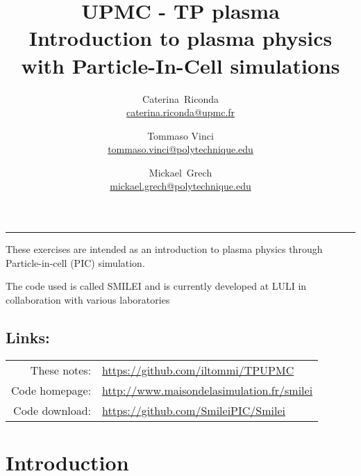 \documentclass[11pt,a4paper]{article}
\begin{document}
\title{UPMC - TP plasma \\ \vspace{10pt} Introduction to plasma physics \\ \vspace{10pt} with Particle-In-Cell simulations}


\author{Caterina~Riconda \\ {\tiny\url{caterina.riconda@upmc.fr}} \and Tommaso Vinci \\ {\tiny\url{tommaso.vinci@polytechnique.edu}} \and Mickael~Grech \\ {\tiny\url{mickael.grech@polytechnique.edu}}}

\date{}

\maketitle              

\hrule
\vspace*{20pt}

These exercises are  intended as an introduction to plasma physics through Particle-in-cell (PIC) simulation.

The code used is called SMILEI and is currently developed at LULI in collaboration with various laboratories 

\subsection*{Links:}
\begin{tabularx}{0.95\textwidth}{rl}
These notes: & \url{https://github.com/iltommi/TPUPMC} \\
Code homepage: & \url{http://www.maisondelasimulation.fr/smilei}\\
Code download: &\url{https://github.com/SmileiPIC/Smilei}
\end{tabularx}


\vspace{20pt}



\tableofcontents


\newpage
\section*{Introduction}\label{intro}
\end{document}
